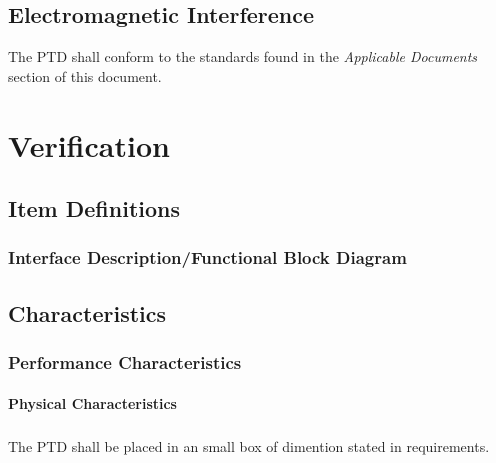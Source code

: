 \documentclass[11pt]{article}
\begin{document}
\subsection{Electromagnetic Interference}
The PTD shall conform to the standards found in the \textit{Applicable Documents} section of this document.


\section{Verification}

\subsection{Item Definitions}

\subsubsection{Interface Description/Functional Block Diagram}




\subsection{Characteristics}

\subsubsection{Performance Characteristics}

\paragraph{Physical Characteristics}
    \subparagraph{} \hangindent=4cm The PTD shall be placed in an small box of dimention stated in requirements.
\end{document}
